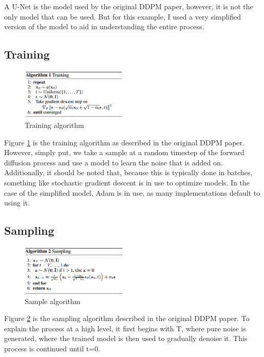\documentclass[conference]{IEEEtran}
\begin{document}
A U-Net is the model used by the original DDPM paper, however, it is not the
only model that can be used. But for this example, I used a very simplified
version of the model\cite{AmanU-net} to aid in understanding the entire
process.

\subsection{Training}

\begin{figure}[htbp]
    \centering
    \includegraphics[width=0.45\textwidth]{../images/train.png}
    \caption{Training algorithm}
    \label{fig:Train}
\end{figure}

Figure \ref{fig:Train} is the training algorithm as described in the original
DDPM paper. However, simply put, we take a sample at a random timestep of the
forward diffusion process and use a model to learn the noise that is added on.
Additionally, it should be noted that, because this is typically done in
batches, something like stochastic gradient descent is in use to optimize
models. In the case of the simplified model, Adam is in use, as many
implementations default to using it.

\subsection{Sampling}

\begin{figure}[htbp]
    \centering
    \includegraphics[width=0.45\textwidth]{../images/sample.png}
    \caption{Sample algorithm}
    \label{fig:Samp}
\end{figure}

Figure \ref{fig:Samp} is the sampling algorithm described in the original DDPM
paper. To explain the process at a high level, it first begins with T, where
pure noise is generated, where the trained model is then used to gradually
denoise it. This process is continued until t=0.
\end{document}
